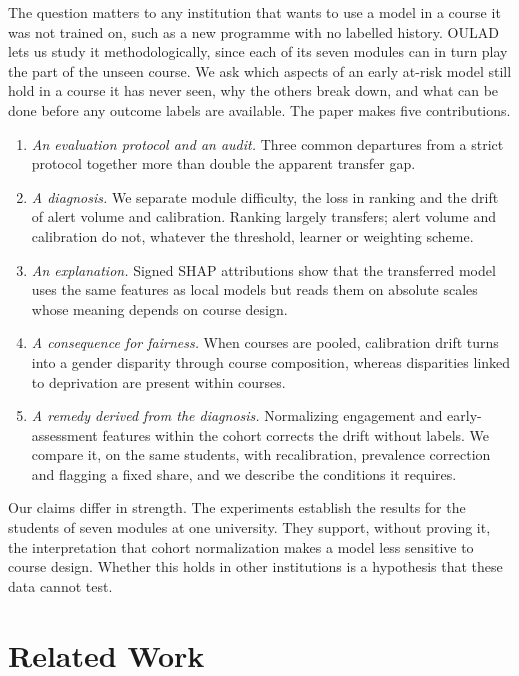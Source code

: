 \documentclass[fleqn,10pt]{JLA_article}
\begin{document}
The question matters to any institution that wants to use a model in a course it was not trained on, such as a new programme with no labelled history. OULAD lets us study it methodologically, since each of its seven modules can in turn play the part of the unseen course. We ask which aspects of an early at-risk model still hold in a course it has never seen, why the others break down, and what can be done before any outcome labels are available. The paper makes five contributions.
\begin{enumerate}
\item \emph{An evaluation protocol and an audit.} Three common departures from a strict protocol together more than double the apparent transfer gap.
\item \emph{A diagnosis.} We separate module difficulty, the loss in ranking and the drift of alert volume and calibration. Ranking largely transfers; alert volume and calibration do not, whatever the threshold, learner or weighting scheme.
\item \emph{An explanation.} Signed SHAP attributions show that the transferred model uses the same features as local models but reads them on absolute scales whose meaning depends on course design.
\item \emph{A consequence for fairness.} When courses are pooled, calibration drift turns into a gender disparity through course composition, whereas disparities linked to deprivation are present within courses.
\item \emph{A remedy derived from the diagnosis.} Normalizing engagement and early-assessment features within the cohort corrects the drift without labels. We compare it, on the same students, with recalibration, prevalence correction and flagging a fixed share, and we describe the conditions it requires.
\end{enumerate}
Our claims differ in strength. The experiments establish the results for the students of seven modules at one university. They support, without proving it, the interpretation that cohort normalization makes a model less sensitive to course design. Whether this holds in other institutions is a hypothesis that these data cannot test.

\section{Related Work}
\label{sec:related}
\end{document}
